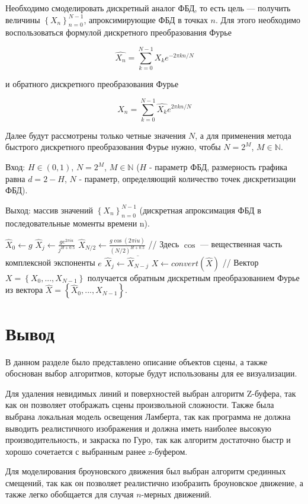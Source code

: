 Необходимо смоделировать дискретный аналог ФБД, то есть цель --- получить величины $\left\{X_n\right\}_{n=0}^{N-1}$, апроксимирующие ФБД в точках $n$. Для этого необходимо воспользоваться формулой дискретного преобразования Фурье

\begin{equation}
	\hat{X_n} = \sum_{k=0}^{N-1}X_ke^{-2\pi kn/N}
\end{equation}

и обратного дискретного преобразования Фурье

\begin{equation}
	X_n = \sum_{k=0}^{N-1}\hat{X_k}e^{2\pi kn/N}
\end{equation}

Далее будут рассмотрены только четные значения $N$, а для применения метода быстрого дискретного преобразования Фурье нужно, чтобы $N=2^M$, $M \in \mathbb{N}$. 

Вход: $H \in (0,1)$, $N=2^M$, $M \in \mathbb{N}$ ($H$ - параметр ФБД, размерность графика равна $d = 2 - H$, $N$ - параметр, определяющий количество точек дискретизации ФБД).

Выход: массив значений $\left\{X_n\right\}_{n=0}^{N-1}$ (дискретная апроксимация ФБД в последовательные моменты времени n).

\begin{algorithmic}[1]
	\State $\hat{X}_0\gets g$
	\State $\hat{X}_j \gets \frac{ge^{2\pi iu}}{j^{H+0.5}}$
	\EndFor
	\State $\hat{X}_{N/2} \gets \frac{g\cos(2\pi iu)}{(N/2)^{H+0.5}}$ // Здесь $\cos$ — вещественная часть комплексной экспоненты $e$
	\State $\hat{X}_j \gets \overline{\hat{X}_{N-j}}$
	\EndFor
	\State $X \gets convert(\hat{X})$ // Вектор $X = \left\{X_0,...,X_{N-1}\right\}$ получается обратным дискретным преобразованием Фурье из вектора $\hat{X} = \left\{\hat{X}_0,...,\hat{X}_{N-1}\right\}$.
\end{algorithmic}

\section*{Вывод}
В данном разделе было представлено описание объектов сцены, а также обоснован выбор алгоритмов, которые будут использованы для ее визуализации.

Для удаления невидимых линий и поверхностей выбран алгоритм Z-буфера, так как он позволяет отображать сцены произвольной сложности.
Также была выбрана локальная модель освещения Ламберта, так как программа не должна выводить реалистичного изображения и должна иметь наиболее высокую производительность, и закраска по Гуро, так как алгоритм достаточно быстр и хорошо сочетается с выбранным ранее z-буфером.

Для моделирования броуновского движения был выбран алгоритм срединных смещений, так как он позволяет реалистично изобразить броуновское движение, а также легко обобщается для случая $n$-мерных движений.
